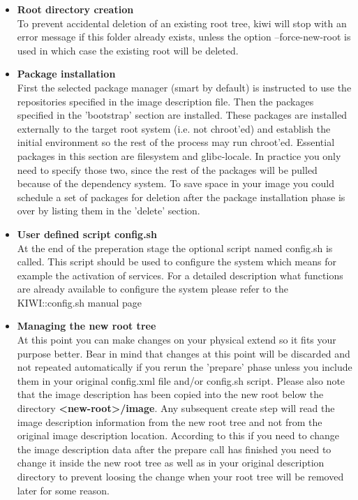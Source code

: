 \begin{itemize}
\item \textbf{Root directory creation}\\
      To prevent accidental deletion of an existing root tree, kiwi will
      stop with an error message if this folder already exists, unless the
      option --force-new-root is used in which case the existing root will
      be deleted.
\item \textbf{Package installation}\\
      First the selected package manager (smart by default) is instructed to
      use the repositories specified in the image description file.
      Then the packages specified in the 'bootstrap' section are installed.
      These packages are installed externally to the target root system
      (i.e. not chroot'ed) and establish the initial environment so the rest
      of  the process may run chroot'ed. Essential packages in this section
      are filesystem and glibc-locale. In practice you only need to
      specify those two, since the rest of the packages will be pulled
      because of the dependency system. To save space in your image you
      could schedule a set of packages for deletion after the package
      installation phase is over by listing them in the 'delete' section.
\item \textbf{User defined script config.sh}\\
      At the end of the preperation stage the optional script named config.sh
      is called. This script should be used to configure the system which means
      for example the activation of services. For a detailed description what
      functions are already available to configure the system please refer to
      the KIWI::config.sh manual page
\item \textbf{Managing the new root tree}\\
      At this point you can make changes on your physical extend so it fits
      your purpose better. Bear in mind that changes at this point will be
      discarded and not repeated automatically if you rerun the 'prepare'
      phase unless you include them in your original config.xml file and/or
      config.sh script. Please also note that the image description has
      been copied into the new root below the directory
      \textbf{<new-root>/image}. Any subsequent create step will read
      the image description information from the new root tree and not
      from the original image description location. According to this
      if you need to change the image description data
      after the prepare call has finished you need to change it inside the
      new root tree as well as in your original description directory to
      prevent loosing the change when your root tree will be removed later
      for some reason.
\end{itemize}

